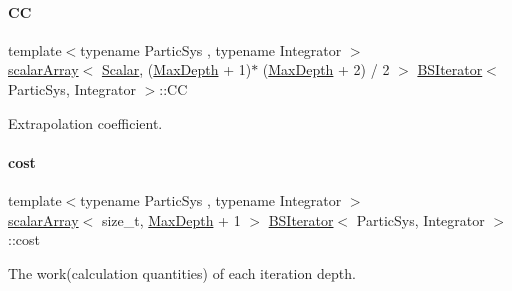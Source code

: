 \paragraph{\texorpdfstring{CC}{CC}}
{\footnotesize\ttfamily template$<$typename Partic\+Sys , typename Integrator $>$ \\
\mbox{\hyperlink{class_b_s_iterator_ab0aa7c10b56500273af05dcd85fd8389}{scalar\+Array}}$<$ \mbox{\hyperlink{class_b_s_iterator_a7857f8ff9032955ea4dcc22cd18ca7a1}{Scalar}}, (\mbox{\hyperlink{class_b_s_iterator_a39409b9a12d4854d101ce59a0efc0f74}{Max\+Depth}} + 1)$\ast$ (\mbox{\hyperlink{class_b_s_iterator_a39409b9a12d4854d101ce59a0efc0f74}{Max\+Depth}} + 2) / 2 $>$ \mbox{\hyperlink{class_b_s_iterator}{B\+S\+Iterator}}$<$ Partic\+Sys, Integrator $>$\+::CC\hspace{0.3cm}{\ttfamily [private]}}



Extrapolation coefficient. 

\mbox{\label{class_b_s_iterator_a53f435811c23c0ae1713df13197fc9c9}} 
\paragraph{\texorpdfstring{cost}{cost}}
{\footnotesize\ttfamily template$<$typename Partic\+Sys , typename Integrator $>$ \\
\mbox{\hyperlink{class_b_s_iterator_ab0aa7c10b56500273af05dcd85fd8389}{scalar\+Array}}$<$ size\+\_\+t, \mbox{\hyperlink{class_b_s_iterator_a39409b9a12d4854d101ce59a0efc0f74}{Max\+Depth}} + 1 $>$ \mbox{\hyperlink{class_b_s_iterator}{B\+S\+Iterator}}$<$ Partic\+Sys, Integrator $>$\+::cost\hspace{0.3cm}{\ttfamily [private]}}



The work(calculation quantities) of each iteration depth. 

\mbox{\label{class_b_s_iterator_aa501e973f342248fc445d59a5166ccc9}} 
